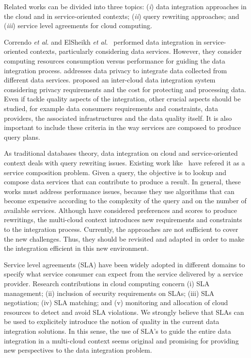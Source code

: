 Related works can be divided into three topics: (\textit{i}) data integration approaches in the cloud and in service-oriented contexts; (\textit{ii}) query rewriting approaches; and (\textit{iii}) service level agreements for cloud computing.

Correndo \textit{et al.} and ElSheikh \textit{et al.}~\cite{Correndo2010,ElSheikh2013} performed data integration in service-oriented contexts, particularly considering data services. However, they  consider computing resources consumption versus performance for guiding the data integration process. \cite{YauY08} addresses data privacy  to integrate data collected from different data services. \cite{Tian2010} proposed an inter-cloud data integration system considering privacy requirements and the cost for protecting and processing data. Even if \cite{Tian2010,YauY08} tackle quality aspects of the integration,  other crucial aspects  should be studied, for example data consumers requirements and constraints, data providers, the associated infrastructures and the data quality itself. It is also important to include these criteria in the way services are composed to produce  query plans.

As traditional databases theory, data integration on cloud and service-oriented context deals with query rewriting issues. Existing work like~\cite{ba2014,Barhamgi2010,Benouaret2011,Umberto} have refered it as a service composition problem. Given a query, the objective is to lookup and compose data services that can contribute to produce a result. In general, these works must address performance issues, because they use algorithms that can become expensive according to the complexity of the query and on the number of available services. Although \cite{ba2014,Benouaret2011} have considered preferences and scores to produce rewritings, the multi-cloud context introduces new requirements and constraints to the integration process. Currently, the approaches are not sufficient to cover the new challenges. Thus, they should be revisited and adapted in order to make the integration efficient in this new environment. 

Service level agreements (SLA) have been widely adopted in different domains to specify what service consumer can expect from the service delivered by a service provider. Research contributions in cloud computing concern (i) SLA management; (ii) inclusion of security requirements on SLAs; (iii) SLA negotiation; (iv) SLA matching; and (v) monitoring and allocation of cloud resources to detect and avoid SLA violations. 
We strongly believe that SLAs can be used  to explicitely introduce the notion of quality in the current data integration solutions. In this sense, the use of SLA's to guide the entire data integration in a multi-cloud context seems original and promising for providing new perspectives to the data integration problem.
